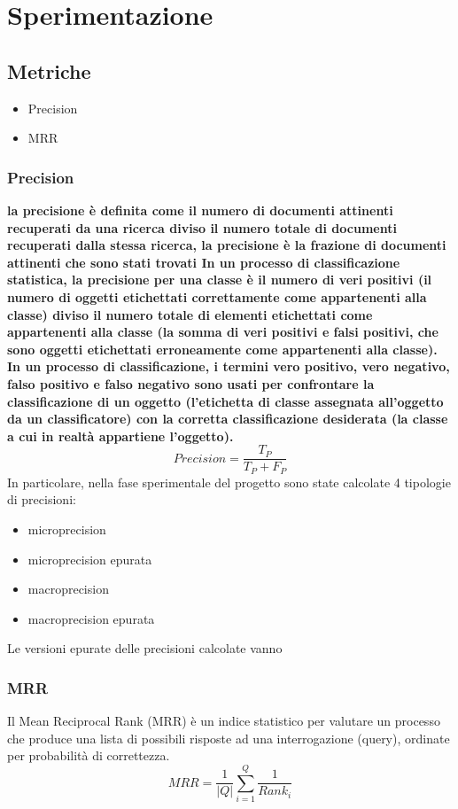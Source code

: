 \section{Sperimentazione}
\label{experiment}


\subsection{Metriche}
\label{metriche}
\begin{itemize}
\item Precision
\item MRR
\end{itemize}
\subsubsection{Precision}
\textbf{la precisione è definita come il numero di documenti attinenti recuperati da una ricerca diviso il numero totale di documenti recuperati dalla stessa ricerca,
la precisione è la frazione di documenti attinenti che sono stati trovati
In un processo di classificazione statistica, la precisione per una classe è il numero di veri positivi (il numero di oggetti etichettati correttamente come appartenenti alla classe) diviso il numero totale di elementi etichettati come appartenenti alla classe (la somma di veri positivi e falsi positivi, che sono oggetti etichettati erroneamente come appartenenti alla classe).
In un processo di classificazione, i termini vero positivo, vero negativo, falso positivo e falso negativo sono usati per confrontare la classificazione di un oggetto (l’etichetta di classe assegnata all’oggetto da un classificatore) con la corretta classificazione desiderata (la classe a cui in realtà appartiene l’oggetto).}
$$
Precision =\frac{T_P}{T_P+F_P}
$$
In particolare, nella fase sperimentale del progetto sono state calcolate 4 tipologie di precisioni:
\begin{itemize}
\item microprecision
\item microprecision epurata
\item macroprecision
\item macroprecision epurata
\end{itemize}
Le versioni epurate delle precisioni calcolate vanno
\subsubsection{MRR}
Il Mean Reciprocal Rank (MRR) è un indice statistico per valutare un processo che produce una lista di possibili risposte ad una interrogazione (query), ordinate per probabilità di correttezza.
$$
\begin{equation}
MRR = \frac{1}{|Q|}\sum_{i=1}^{Q}{\frac{1}{Rank_i}}
\end{equation}
$$

